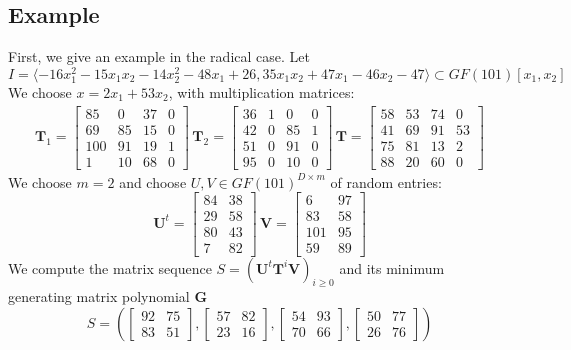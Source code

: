 \documentclass[12pt]{article}
\def\mG{\mathbf{G}}
\def\mT{\mathbf{T}}
\def\mU{\mathbf{U}}
\def\mV{\mathbf{V}}
\begin{document}
\newpage
\subsection{Example}
First, we give an example in the radical case. Let
$$I = \langle -16x_1^2 - 15x_1x_2 - 14x_2^2 - 48x_1 + 26, 35x_1x_2 + 47x_1 - 46x_2 - 47 \rangle \subset GF(101)[x_1,x_2]$$
We choose $x = 2x_1 + 53 x_2$, with multiplication matrices:
\begin{align*}
\mT_1 = \begin{bmatrix}
 85&   0&  37&   0\\
 69&  85&  15&   0\\
100&  91&  19&   1\\
  1&  10&  68&   0
\end{bmatrix}\,
\mT_2 = \begin{bmatrix}
36&  1&  0&  0\\
42&  0& 85&  1\\
51&  0& 91&  0\\
95&  0& 10&  0
\end{bmatrix}\,
\mT = \begin{bmatrix}
58& 53& 74&  0\\
41& 69& 91& 53\\
75& 81& 13&  2\\
88& 20& 60&  0
\end{bmatrix}
\end{align*}
We choose $m = 2$ and choose $U,V \in GF(101)^{D\times m}$ of random
entries:
$$ \mU^t = \begin{bmatrix}
84& 38\\
29& 58\\
80& 43\\
 7& 82
\end{bmatrix}\,
\mV = \begin{bmatrix}
  6&  97\\
 83&  58\\
101&  95\\
 59&  89
\end{bmatrix}
$$
We compute the matrix sequence $S = (\mU^t\mT^i\mV)_{i\ge0}$ and its minimum generating matrix polynomial $\mG$
$$ S = (
\begin{bmatrix}
92& 75\\  
83& 51
\end{bmatrix},
\begin{bmatrix}
57& 82\\  
23& 16
\end{bmatrix},
\begin{bmatrix}
54& 93\\  
70& 66
\end{bmatrix},
\begin{bmatrix}
50& 77\\
26& 76
\end{bmatrix}
)$$
\end{document}
